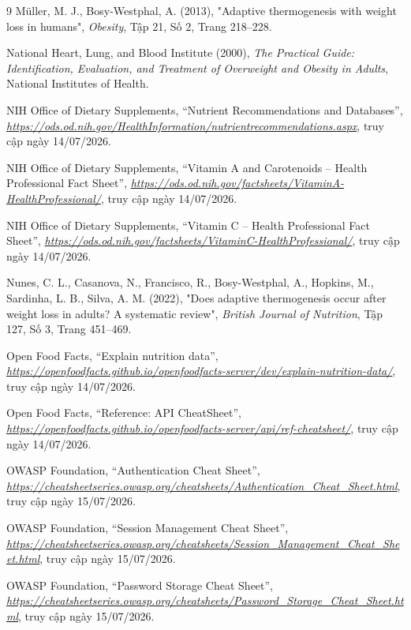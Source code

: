 \documentclass[12pt, a4paper]{report}
\begin{document}
\begin{thebibliography}{9}
Müller, M. J., Bosy-Westphal, A. (2013),
"Adaptive thermogenesis with weight loss in humans",
\textit{Obesity}, Tập 21, Số 2, Trang 218--228.

National Heart, Lung, and Blood Institute (2000),
\textit{The Practical Guide: Identification, Evaluation, and Treatment of Overweight and Obesity in Adults},
National Institutes of Health.

NIH Office of Dietary Supplements,
``Nutrient Recommendations and Databases'',
\textit{\url{https://ods.od.nih.gov/HealthInformation/nutrientrecommendations.aspx}},
truy cập ngày 14/07/2026.

NIH Office of Dietary Supplements,
``Vitamin A and Carotenoids -- Health Professional Fact Sheet'',
\textit{\url{https://ods.od.nih.gov/factsheets/VitaminA-HealthProfessional/}},
truy cập ngày 14/07/2026.

NIH Office of Dietary Supplements,
``Vitamin C -- Health Professional Fact Sheet'',
\textit{\url{https://ods.od.nih.gov/factsheets/VitaminC-HealthProfessional/}},
truy cập ngày 14/07/2026.

Nunes, C. L., Casanova, N., Francisco, R., Bosy-Westphal, A., Hopkins, M., Sardinha, L. B., Silva, A. M. (2022),
"Does adaptive thermogenesis occur after weight loss in adults? A systematic review",
\textit{British Journal of Nutrition}, Tập 127, Số 3, Trang 451--469.

Open Food Facts, ``Explain nutrition data'',
\textit{\url{https://openfoodfacts.github.io/openfoodfacts-server/dev/explain-nutrition-data/}},
truy cập ngày 14/07/2026.

Open Food Facts, ``Reference: API CheatSheet'',
\textit{\url{https://openfoodfacts.github.io/openfoodfacts-server/api/ref-cheatsheet/}},
truy cập ngày 14/07/2026.

OWASP Foundation,
``Authentication Cheat Sheet'',
\textit{\url{https://cheatsheetseries.owasp.org/cheatsheets/Authentication_Cheat_Sheet.html}},
truy cập ngày 15/07/2026.

OWASP Foundation,
``Session Management Cheat Sheet'',
\textit{\url{https://cheatsheetseries.owasp.org/cheatsheets/Session_Management_Cheat_Sheet.html}},
truy cập ngày 15/07/2026.

OWASP Foundation,
``Password Storage Cheat Sheet'',
\textit{\url{https://cheatsheetseries.owasp.org/cheatsheets/Password_Storage_Cheat_Sheet.html}},
truy cập ngày 15/07/2026.


\end{thebibliography}
\end{document}
